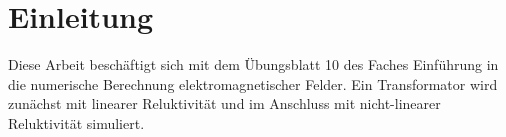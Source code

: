 \chapter{Einleitung}\label{sec:intro}
Diese Arbeit beschäftigt sich mit dem Übungsblatt 10 des Faches \glqq Einführung in die numerische Berechnung elektromagnetischer Felder\grqq{}.
Ein Transformator wird zunächst mit linearer Reluktivität und im Anschluss mit nicht-linearer Reluktivität simuliert.